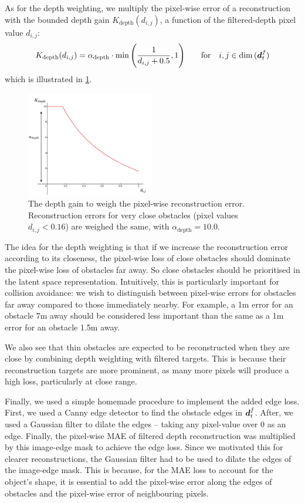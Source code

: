 As for the depth weighting, we multiply the pixel-wise error of a reconstruction with the bounded depth gain $K_{\text{depth}}(d_{i,j})$, a function of the filtered-depth pixel value $d_{i,j}$:
\begin{equation}
    K_{\text{depth}}(d_{i,j}) = \alpha_\text{depth} \cdot \min \Bigg(\frac{1}{d_{i,j} + 0.5}, 1\Bigg) \qquad \text{for} \quad  i, j \in \dim \, ({\boldsymbol{d}}_t^f)
\end{equation}
which is illustrated in \cref{fig:5_depth_gain}.
\begin{figure}[hbt]
    \centering
    \includegraphics[width=0.5\textwidth]{figures/5_/5_depth_gain.pdf}
    \caption{The depth gain to weigh the pixel-wise reconstruction error. Reconstruction errors for very close obstacles (pixel values $d_{i,j}<0.16$) are weighed the same, with $\alpha_\text{depth} = 10.0$.}
    \label{fig:5_depth_gain}
\end{figure}
The idea for the depth weighting is that if we increase the reconstruction error according to its closeness, the pixel-wise loss of close obstacles should dominate the pixel-wise loss of obstacles far away. So close obstacles should be prioritised in the latent space representation.
Intuitively, this is particularly important for collision avoidance: we wish to distinguish between pixel-wise errors for obstacles far away compared to those immediately nearby. For example, a 1m error for an obstacle 7m away should be considered less important than the same as a 1m error for an obstacle 1.5m away.

We also see that thin obstacles are expected to be reconstructed when they are close by combining depth weighting with filtered targets. This is because their reconstruction targets are more prominent, as many more pixels will produce a high loss, particularly at close range.

Finally, we used a simple homemade procedure to implement the added edge loss. First, we used a Canny edge detector \cite{canny_edge_detection} to find the obstacle edges in ${\boldsymbol{d}}_t^f$. After, we used a Gaussian filter to dilate the edges -- taking any pixel-value over 0 as an edge. Finally, the pixel-wise MAE of filtered depth reconstruction was multiplied by this image-edge mask to achieve the edge loss. Since we motivated this for clearer reconstructions, the Gaussian filter had to be used to dilate the edges of the image-edge mask. This is because, for the MAE loss to account for the object's shape, it is essential to add the pixel-wise error along the edges of obstacles and the pixel-wise error of neighbouring pixels. 


